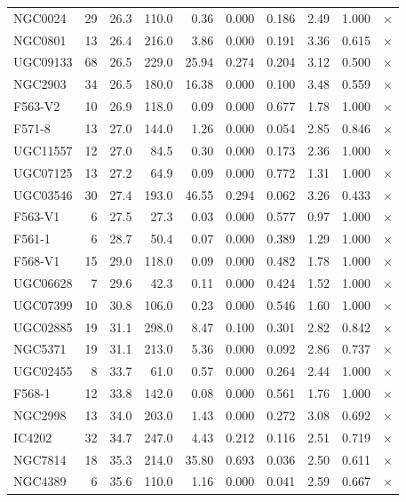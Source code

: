 \begin{longtable}{lrrrrrrrrr}
NGC0024 & 29 & 26.3 & 110.0 & 0.36 & 0.000 & 0.186 & 2.49 & 1.000 & $\times$ \\
NGC0801 & 13 & 26.4 & 216.0 & 3.86 & 0.000 & 0.191 & 3.36 & 0.615 & $\times$ \\
UGC09133 & 68 & 26.5 & 229.0 & 25.94 & 0.274 & 0.204 & 3.12 & 0.500 & $\times$ \\
NGC2903 & 34 & 26.5 & 180.0 & 16.38 & 0.000 & 0.100 & 3.48 & 0.559 & $\times$ \\
F563-V2 & 10 & 26.9 & 118.0 & 0.09 & 0.000 & 0.677 & 1.78 & 1.000 & $\times$ \\
F571-8 & 13 & 27.0 & 144.0 & 1.26 & 0.000 & 0.054 & 2.85 & 0.846 & $\times$ \\
UGC11557 & 12 & 27.0 & 84.5 & 0.30 & 0.000 & 0.173 & 2.36 & 1.000 & $\times$ \\
UGC07125 & 13 & 27.2 & 64.9 & 0.09 & 0.000 & 0.772 & 1.31 & 1.000 & $\times$ \\
UGC03546 & 30 & 27.4 & 193.0 & 46.55 & 0.294 & 0.062 & 3.26 & 0.433 & $\times$ \\
F563-V1 & 6 & 27.5 & 27.3 & 0.03 & 0.000 & 0.577 & 0.97 & 1.000 & $\times$ \\
F561-1 & 6 & 28.7 & 50.4 & 0.07 & 0.000 & 0.389 & 1.29 & 1.000 & $\times$ \\
F568-V1 & 15 & 29.0 & 118.0 & 0.09 & 0.000 & 0.482 & 1.78 & 1.000 & $\times$ \\
UGC06628 & 7 & 29.6 & 42.3 & 0.11 & 0.000 & 0.424 & 1.52 & 1.000 & $\times$ \\
UGC07399 & 10 & 30.8 & 106.0 & 0.23 & 0.000 & 0.546 & 1.60 & 1.000 & $\times$ \\
UGC02885 & 19 & 31.1 & 298.0 & 8.47 & 0.100 & 0.301 & 2.82 & 0.842 & $\times$ \\
NGC5371 & 19 & 31.1 & 213.0 & 5.36 & 0.000 & 0.092 & 2.86 & 0.737 & $\times$ \\
UGC02455 & 8 & 33.7 & 61.0 & 0.57 & 0.000 & 0.264 & 2.44 & 1.000 & $\times$ \\
F568-1 & 12 & 33.8 & 142.0 & 0.08 & 0.000 & 0.561 & 1.76 & 1.000 & $\times$ \\
NGC2998 & 13 & 34.0 & 203.0 & 1.43 & 0.000 & 0.272 & 3.08 & 0.692 & $\times$ \\
IC4202 & 32 & 34.7 & 247.0 & 4.43 & 0.212 & 0.116 & 2.51 & 0.719 & $\times$ \\
NGC7814 & 18 & 35.3 & 214.0 & 35.80 & 0.693 & 0.036 & 2.50 & 0.611 & $\times$ \\
NGC4389 & 6 & 35.6 & 110.0 & 1.16 & 0.000 & 0.041 & 2.59 & 0.667 & $\times$ \\

\end{longtable}
